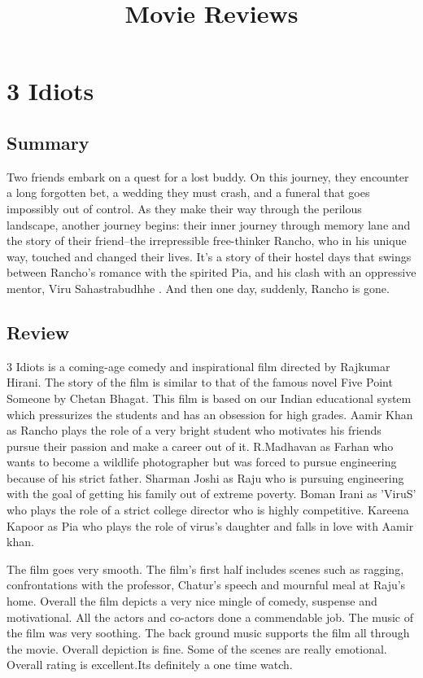 \documentclass[11pt]{article} %
\title{Movie Reviews}
\author{}
\begin{document}
\maketitle

\section{3 Idiots}
\subsection{Summary}
Two friends embark on a quest for a lost buddy. On this journey, they encounter a long forgotten bet, a wedding they must crash, and a funeral that goes impossibly out of control. As they make their way through the perilous landscape, another journey begins: their inner journey through memory lane and the story of their friend--the irrepressible free-thinker Rancho, who in his unique way, touched and changed their lives. It’s a story of their hostel days that swings between Rancho’s romance with the spirited Pia, and his clash with an oppressive mentor, Viru Sahastrabudhhe . And then one day, suddenly, Rancho is gone.

\subsection{Review}
3 Idiots is a coming-age comedy and inspirational film directed by Rajkumar Hirani. The story of the film is similar to that of the famous novel Five Point Someone by Chetan Bhagat. This film is based on our Indian educational system which pressurizes the students and has an obsession for high grades.  Aamir Khan as Rancho plays the role of a very bright student who motivates his friends pursue their passion and make a career out of it. R.Madhavan as Farhan who wants to become a wildlife photographer but was forced to pursue engineering because of his strict father. Sharman Joshi as Raju who is pursuing engineering with the goal of getting his family out of extreme poverty. Boman Irani as 'ViruS' who plays the role of a strict college director who is highly competitive. Kareena Kapoor as Pia who plays the role of virus’s daughter and falls in love with Aamir khan.

The film goes very smooth. The film’s first half includes scenes such as ragging, confrontations with the professor, Chatur’s speech and mournful meal at Raju’s home. Overall the film depicts a very nice mingle of comedy, suspense and motivational. All the actors and co-actors done a commendable job. The music of the film was very soothing. The back ground music supports the film all through the movie. Overall depiction is fine. Some of the scenes are really emotional. Overall rating is excellent.Its definitely a one time watch.
\end{document}
